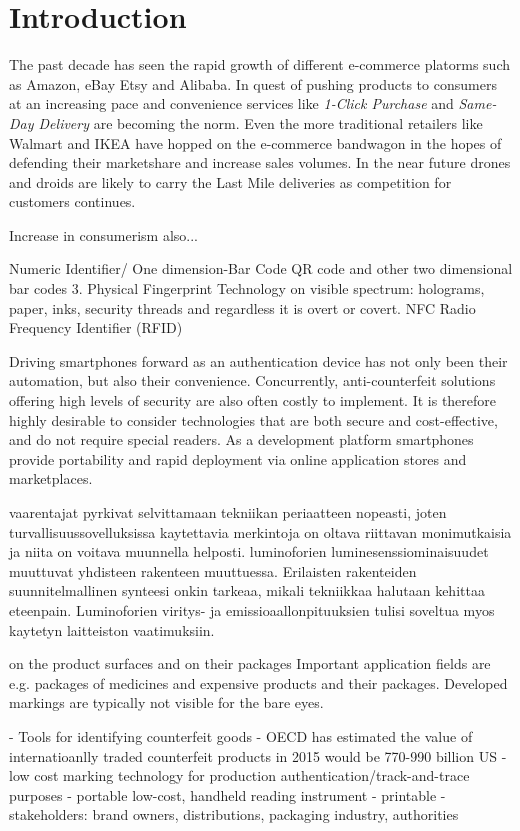 \documentclass[thesis.tex]{subfiles}
\begin{document}
\chapter{Introduction}
\label{chapter:intro}

The past decade has seen the rapid growth of different e-commerce platorms such as Amazon, eBay Etsy and Alibaba. In quest of pushing products to consumers at an increasing pace and convenience services like \emph{1-Click Purchase} and \emph{Same-Day Delivery} are becoming the norm. Even the more traditional retailers like Walmart and IKEA have hopped on the e-commerce bandwagon in the hopes of defending their marketshare and increase sales volumes. In the near future drones and droids are likely to carry the Last Mile deliveries as competition for customers continues.

Increase in consumerism also...

Numeric Identifier/ One dimension-Bar Code
QR code and other two dimensional bar codes
3. Physical Fingerprint Technology on visible spectrum: holograms, paper, inks, security threads and regardless it is overt or covert.
NFC Radio Frequency Identifier (RFID)

Driving smartphones forward as an authentication device has not only been their automation, but also their convenience. Concurrently, anti-counterfeit solutions offering high levels of security are also often costly to implement. It is therefore highly desirable to consider technologies that are both secure and cost-effective, and do not require special readers. As a development platform smartphones provide portability and rapid deployment via online application stores and marketplaces.

vaarentajat pyrkivat selvittamaan tekniikan periaatteen nopeasti, joten turvallisuussovelluksissa kaytettavia merkintoja on oltava riittavan monimutkaisia ja niita on voitava muunnella helposti. luminoforien luminesenssiominaisuudet muuttuvat yhdisteen rakenteen muuttuessa. Erilaisten rakenteiden suunnitelmallinen synteesi onkin tarkeaa, mikali tekniikkaa halutaan kehittaa eteenpain. Luminoforien viritys- ja emissioaallonpituuksien tulisi soveltua myos kaytetyn laitteiston vaatimuksiin.

on the product surfaces and on their packages
Important application fields are e.g. packages of medicines and expensive products and their packages. Developed markings are typically not visible for the bare eyes.

- Tools for identifying counterfeit goods
- OECD has estimated the value of internatioanlly traded counterfeit products in 2015 would be 770-990 billion US
- low cost marking technology for production authentication/track-and-trace purposes
- portable low-cost, handheld reading instrument
- printable
- stakeholders: brand owners, distributions, packaging industry, authorities
\end{document}
